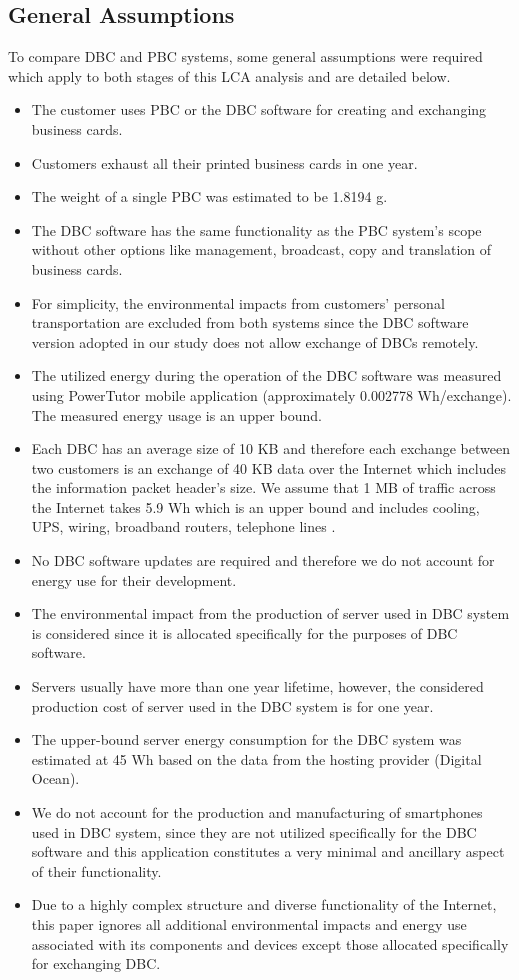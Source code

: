 \documentclass[3p,times,procedia]{elsarticle}
\begin{document}
\subsection{General Assumptions}\label{Generalassume}
To compare DBC and PBC systems, some general assumptions were required which apply to both stages of this LCA analysis and are detailed below.

\begin{itemize}[]
\item The customer uses PBC or the DBC software for creating and exchanging business cards.
\item Customers exhaust all their printed business cards in one year.
\item The weight of a single PBC was estimated to be 1.8194 g.
\item The DBC software has the same functionality as the PBC system's scope without other options like management, broadcast, copy and translation of business cards.
\item For simplicity, the environmental impacts from customers' personal transportation are excluded from both systems since the DBC software version adopted in our study does not allow exchange of DBCs remotely.
\item The utilized energy during the operation of the DBC software was measured using PowerTutor mobile application\cite{zhang2010accurate} (approximately 0.002778 Wh/exchange). The measured energy usage is an upper bound.
 \item Each DBC has an average size of 10 KB and therefore each exchange between two customers is an exchange of 40 KB data over the Internet which includes the information packet header's size. We assume that 1 MB of traffic across the Internet takes 5.9 Wh which is an upper bound and includes cooling, UPS, wiring, broadband routers, telephone lines \cite{Moshnyaga:2013}. 
\item No DBC software updates are required and therefore we do not account for energy use for their development.
\item The environmental impact from the production of server used in DBC system is considered since it is allocated specifically for the purposes of DBC software.
\item Servers usually have more than one year lifetime, however, the considered production cost of server used in the DBC system is for one year.
 \item The upper-bound server energy consumption for the DBC system was estimated at 45 Wh based on the data from the hosting provider (Digital Ocean).
\item We do not account for the production and manufacturing of smartphones used in DBC system, since they are not utilized specifically for the DBC software and this application constitutes a very minimal and ancillary aspect of their functionality.
\item Due to a highly complex structure and diverse functionality of the Internet, this paper ignores all additional environmental impacts and energy use associated with its components and devices except those allocated specifically for exchanging DBC.
\end{itemize}
\end{document}
